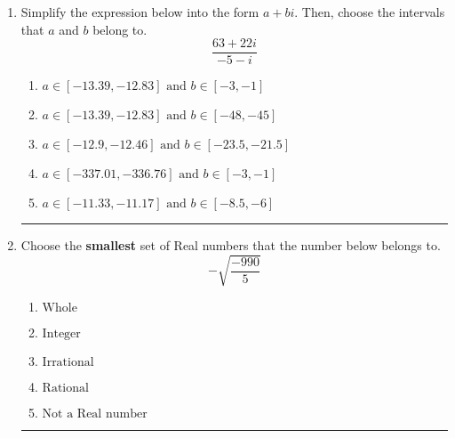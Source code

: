 \documentclass[14pt]{extbook}
\newcommand{\litem}[1]{\item#1\hspace*{-1cm}\rule{\textwidth}{0.4pt}}
\begin{document}
\begin{enumerate}
{\begin{enumerate}[label=\Alph*.]
\end{enumerate} }
\litem{
Simplify the expression below into the form $a+bi$. Then, choose the intervals that $a$ and $b$ belong to.\[ \frac{63 + 22 i}{-5 - i} \]\begin{enumerate}[label=\Alph*.]
\item \( a \in [-13.39, -12.83] \text{ and } b \in [-3, -1] \)
\item \( a \in [-13.39, -12.83] \text{ and } b \in [-48, -45] \)
\item \( a \in [-12.9, -12.46] \text{ and } b \in [-23.5, -21.5] \)
\item \( a \in [-337.01, -336.76] \text{ and } b \in [-3, -1] \)
\item \( a \in [-11.33, -11.17] \text{ and } b \in [-8.5, -6] \)

\end{enumerate} }
\litem{
Choose the \textbf{smallest} set of Real numbers that the number below belongs to.\[ -\sqrt{\frac{-990}{5}} \]\begin{enumerate}[label=\Alph*.]
\item \( \text{Whole} \)
\item \( \text{Integer} \)
\item \( \text{Irrational} \)
\item \( \text{Rational} \)
\item \( \text{Not a Real number} \)

\end{enumerate} }
\end{enumerate}
\end{document}
